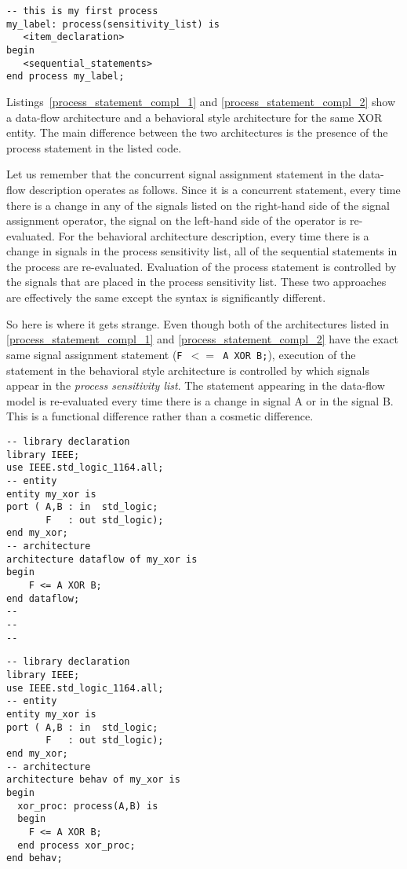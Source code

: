\begin{lstlisting}[float, label=process_statement, caption=Syntax for the process statement.]
-- this is my first process
my_label: process(sensitivity_list) is
   <item_declaration>
begin
   <sequential_statements>
end process my_label;
\end{lstlisting}

Listings~\ref{process_statement_compl_1} and \ref{process_statement_compl_2} show a data-flow architecture and a behavioral style architecture for the same XOR entity. The main difference between the two architectures is the presence of the process statement in the listed code. 

Let us remember that the concurrent signal assignment statement in the data-flow description operates as follows. Since it is a concurrent statement, every time there is a change in any of the signals listed on the right-hand side of the signal assignment operator, the signal on the left-hand side of the operator is re-evaluated. For the behavioral architecture description, every time there is a change in signals in the process sensitivity list, all of the sequential statements in the process are re-evaluated. Evaluation of the process statement is controlled by the signals that are placed in the process sensitivity list. These two approaches are effectively the same except the syntax is significantly different. 

So here is where it gets strange. Even though both of the architectures listed in \ref{process_statement_compl_1} and \ref{process_statement_compl_2} have the exact same signal assignment statement (\texttt{F $<=$ A XOR B;}), execution of the statement in the behavioral style architecture is controlled by which signals appear in the \textit{process sensitivity list}. The statement appearing in the data-flow model is re-evaluated every time there is a change in signal A or in the signal B. This is a functional difference rather than a cosmetic difference.

\noindent
\begin{minipage}{0.49\linewidth}
\begin{lstlisting}[label=process_statement_compl_1, caption=Data-flow architecture.]
-- library declaration
library IEEE;
use IEEE.std_logic_1164.all;
-- entity
entity my_xor is
port ( A,B : in  std_logic;
       F   : out std_logic);
end my_xor;
-- architecture
architecture dataflow of my_xor is
begin
	F <= A XOR B;
end dataflow;
--
--
--
\end{lstlisting}
\end{minipage}
\begin{minipage}{0.49\linewidth}
\begin{lstlisting}[label=process_statement_compl_2, caption=Behavioral architecture.]
-- library declaration
library IEEE;
use IEEE.std_logic_1164.all;
-- entity
entity my_xor is
port ( A,B : in  std_logic;
       F   : out std_logic);
end my_xor;
-- architecture
architecture behav of my_xor is
begin
  xor_proc: process(A,B) is
  begin
	F <= A XOR B;
  end process xor_proc;
end behav;

\end{lstlisting}
\end{minipage}

